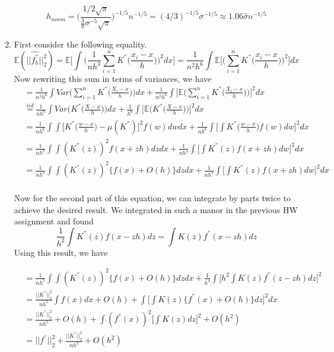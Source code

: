 \documentclass[12pt]{article}  %
\newcommand{\E}{{\mathbb{E}}}
\begin{document}
\begin{enumerate}
$$h_{norm} = \bigg(\frac{1/2\sqrt{\pi}}{\frac{3}{8}\sigma^{-5}\sqrt{\pi}}\bigg)^{-1/5}n^{-1/5} = (4/3)^{-1/5}\sigma^{-1/5}\approx 1.06\hat{\sigma}n^{-1/5}$$


\item First consider the following equality.  
$$
\E(||\widehat{f^{''}_{h}}||_2^2) = \E\Big[\int\bigg(\frac{1}{nh^3}\sum_{i=1}^{n}K^{''}\big(\frac{x_i - x}{h}\big)\bigg)^2dx\Big] =\frac{1}{n^2h^6}\int \E\Big[\Big(\sum_{i=1}^n K^{''}\big(\frac{x_i-x}{h}\big)\Big)^2\Big]dx$$
Now rewriting this sum in terms of variances, we have 
\begin{align*}
&= \frac{1}{n^2h^6}\int Var\Big(\sum_{i=1}^{n}K^{''}\big(\frac{X_i - x}{h}\big)\Big)dx + \frac{1}{n^2h^6}\int \Big[\E\big(\sum_{i=1}^{n}K^{''}\big(\frac{X_i-x}{h}\big)\big)\Big]^2dx\\
&\overset{iid}{=}\frac{1}{nh^6}\int Var\Big(K^{''}\big(\frac{X - x}{h}\big)\Big)dx + \frac{1}{h^6}\int \Big[\E\big(K^{''}\big(\frac{X-x}{h}\big)\big)\Big]^2dx\\
&= \frac{1}{nh^6}\int\int \Big[K^{''}\big(\frac{w - x}{h}\big)-\mu(K^{''})\Big]^2f(w)dwdx + \frac{1}{nh^6}\int\Big[\int K^{''}\big(\frac{w - x}{h}\big)f(w)dw\Big]^2dx\\
&= \frac{1}{nh^5}\int\int (K^{''}(z))^2f(x+zh)dzdx +\frac{1}{nh^4}\int \Big[\int K^{''}(z)f(x+zh)dw\Big]^2dx\\
&=\frac{1}{nh^5}\int\int (K^{''}(z))^2\Big\{f(x) + O(h)\Big\}dzdx +\frac{1}{nh^4}\int \Big[\int K^{''}(z)f(x+zh)dw\Big]^2dx\\
\end{align*}

Now for the second part of this equation, we can integrate by parts twice to achieve the desired result. We integrated in such a manor in the previous HW assignment and found $$\frac{1}{h^2}\int K^{''}(z)f(x-zh)dz = \int K(z)f^{''}(x-zh)dz$$ Using this result, we have 

\begin{align*}
&=\frac{1}{nh^5}\int\int (K^{''}(z))^2\Big\{f(x) + O(h)\Big\}dzdx +\frac{1}{h^4}\int\Big[h^2\int K(z)f^{''}(z-zh)dz\Big]^2\\
&= \frac{||K^{''}||_2^2}{nh^5}\int f(x)dx + O(h)+ \int\Big[\int K(z)\big\{f^{''}(x) + O(h)\big\}dz\Big]^2dx\\
& = \frac{||K^{''}||_2^2}{nh^5} + O(h) + \int (f^{''}(x))^2\Big[\int K(z)dz\Big]^2 + O(h^2)\\
&= ||f^{''}||_2^2 + \frac{||K^{''}||_2^2}{nh^5}  + O(h^2)
\end{align*}


\end{enumerate}
\end{document}
